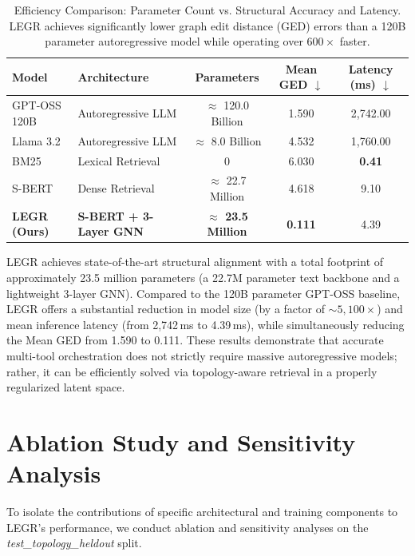 \documentclass{article}
\begin{document}
\begin{table}[h]
\caption{Efficiency Comparison: Parameter Count vs. Structural Accuracy and Latency. LEGR achieves significantly lower graph edit distance (GED) errors than a 120B parameter autoregressive model while operating over $600\times$ faster.}
\label{tab:model_size}
\centering
\small
\begin{tabular}{@{}llccc@{}}
\toprule
\textbf{Model} & \textbf{Architecture} & \textbf{Parameters} & \textbf{Mean GED $\downarrow$} & \textbf{Latency (ms) $\downarrow$} \\
\midrule
GPT-OSS 120B & Autoregressive LLM & $\approx$ 120.0 Billion & 1.590 & 2,742.00 \\
Llama 3.2    & Autoregressive LLM & $\approx$ 8.0 Billion   & 4.532 & 1,760.00 \\
\midrule
BM25         & Lexical Retrieval  & 0                       & 6.030 & \textbf{0.41} \\
S-BERT       & Dense Retrieval    & $\approx$ 22.7 Million  & 4.618 & 9.10 \\
\textbf{LEGR (Ours)} & \textbf{S-BERT + 3-Layer GNN} & \textbf{$\approx$ 23.5 Million} & \textbf{0.111} & 4.39 \\
\bottomrule
\end{tabular}
\end{table}

LEGR achieves state-of-the-art structural alignment with a total footprint of approximately 23.5 million parameters (a 22.7M parameter text backbone and a lightweight 3-layer GNN). Compared to the 120B parameter GPT-OSS baseline, LEGR offers a substantial reduction in model size (by a factor of $\sim 5,100\times$) and mean inference latency (from 2,742\,ms to 4.39\,ms), while simultaneously reducing the Mean GED from 1.590 to 0.111. These results demonstrate that accurate multi-tool orchestration does not strictly require massive autoregressive models; rather, it can be efficiently solved via topology-aware retrieval in a properly regularized latent space.

\section{Ablation Study and Sensitivity Analysis}

To isolate the contributions of specific architectural and training components to LEGR's performance, we conduct ablation and sensitivity analyses on the \textit{test\_topology\_heldout} split.
\end{document}
